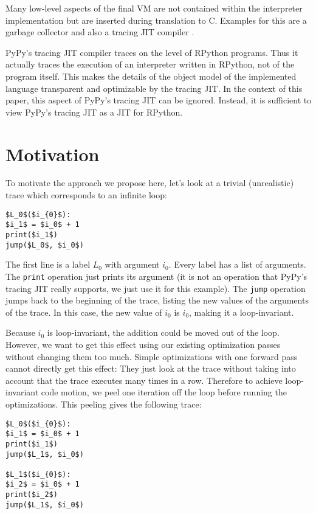 \documentclass[preprint]{sigplanconf}
\let\oldcite=\cite
\renewcommand\cite[1]{\ifthenelse{\equal{#1}{XXX}}{[citation~needed]}{\oldcite{#1}}}
\begin{document}
Many low-level aspects of the final VM are not contained within the interpreter
implementation but are inserted during translation to C. Examples for this are a
garbage collector and also a tracing JIT compiler \cite{bolz_tracing_2009}.

PyPy's tracing JIT compiler traces on the level of RPython programs. Thus it
actually traces the execution of an interpreter written in RPython, not of the
program itself. This makes the details of the object model of the implemented
language transparent and optimizable by the tracing JIT. In the context of this
paper, this aspect of PyPy's tracing JIT can be ignored. Instead, it is
sufficient to view PyPy's tracing JIT as a JIT for RPython.



\section{Motivation}
\label{sec:Motivation}

To motivate the approach we propose here, let's look at a trivial (unrealistic)
trace which corresponds to an infinite loop:

\begin{lstlisting}[mathescape,numbers = right,basicstyle=\setstretch{1.05}\ttfamily\scriptsize]
$L_0$($i_{0}$):
$i_1$ = $i_0$ + 1
print($i_1$)
jump($L_0$, $i_0$)
\end{lstlisting}

The first line is a label $L_0$ with argument $i_0$. Every label has a list of
arguments. The \lstinline{print} operation just prints its argument (it is not
an operation that PyPy's tracing JIT really supports, we just use it for this
example). The \lstinline{jump} operation jumps back to the beginning of the
trace, listing the new values of the arguments of the trace. In this case, the
new value of $i_0$ is $i_0$, making it a loop-invariant.

Because $i_0$ is loop-invariant, the addition could be moved out of the loop.
However, we want to get this effect using our existing optimization passes
without changing them too much. Simple optimizations with one forward pass
cannot directly get this effect: They just look at the trace without taking
into account that the trace executes many times in a row. Therefore to achieve
loop-invariant code motion, we peel one iteration off the loop before running
the optimizations. This peeling gives the following trace:

\begin{lstlisting}[mathescape,numbers = right,basicstyle=\setstretch{1.05}\ttfamily\scriptsize]
$L_0$($i_{0}$):
$i_1$ = $i_0$ + 1
print($i_1$)
jump($L_1$, $i_0$)

$L_1$($i_{0}$):
$i_2$ = $i_0$ + 1
print($i_2$)
jump($L_1$, $i_0$)
\end{lstlisting}
\end{document}
